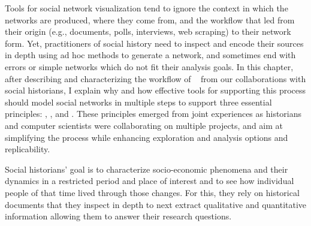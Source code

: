 Tools for social network visualization tend to ignore the context in which the networks are produced, where they come from, and the workflow that led from their origin (e.g., documents, polls, interviews, web scraping) to their network form.
Yet, practitioners of social history need to inspect and encode their sources in depth using ad hoc methods to generate a network, and sometimes end with errors or simple networks which do not fit their analysis goals\cite{lemercierQuantitativeMethodsHumanities2019}.
In this chapter, after describing and characterizing the workflow of \hsna~\cite{wetherellHistoricalSocialNetwork1998} from our collaborations with social historians, I explain why and how effective tools for supporting this process should model social networks in multiple steps to support three essential principles: \traceability, \reality, and \simplicity.
These principles emerged from joint experiences as historians and computer scientists were collaborating on multiple projects, and aim at simplifying the \hsna process while enhancing exploration and analysis options and replicability.

Social historians' goal is to characterize socio-economic phenomena and their dynamics in a restricted period and place of interest and to see how individual people of that time lived through those changes\cite{tilly1984retrieving}.
For this, they rely on historical documents that they inspect in depth to next extract qualitative and quantitative information allowing them to answer their research questions.

